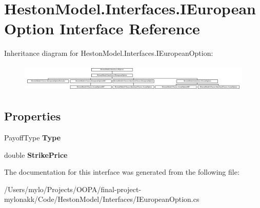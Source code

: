 \hypertarget{interface_heston_model_1_1_interfaces_1_1_i_european_option}{}\section{Heston\+Model.\+Interfaces.\+I\+European\+Option Interface Reference}
\label{interface_heston_model_1_1_interfaces_1_1_i_european_option}
Inheritance diagram for Heston\+Model.\+Interfaces.\+I\+European\+Option\+:\begin{figure}[H]
\begin{center}
\leavevmode
\includegraphics[height=1.333333cm]{interface_heston_model_1_1_interfaces_1_1_i_european_option}
\end{center}
\end{figure}
\subsection*{Properties}
\begin{DoxyCompactItemize}
\item 
\mbox{\label{interface_heston_model_1_1_interfaces_1_1_i_european_option_a62269b52694738828cbcc029a3367a0e}} 
Payoff\+Type {\bfseries Type}
\item 
\mbox{\label{interface_heston_model_1_1_interfaces_1_1_i_european_option_a48c162e99baf2ce01bd740d33327828c}} 
double {\bfseries Strike\+Price}
\end{DoxyCompactItemize}


The documentation for this interface was generated from the following file\+:\begin{DoxyCompactItemize}
\item 
/\+Users/mylo/\+Projects/\+O\+O\+P\+A/final-\/project-\/mylonakk/\+Code/\+Heston\+Model/\+Interfaces/I\+European\+Option.\+cs\end{DoxyCompactItemize}
